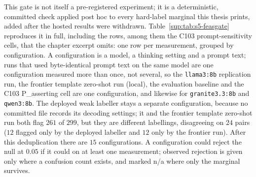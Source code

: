 This gate is not itself a pre-registered experiment; it is a deterministic,
committed check applied post hoc to every hard-label marginal this thesis
prints, added after the hosted results were withdrawn.
Table~\ref{sup:tab:s5-feasgate} reproduces it in full, including the rows,
among them the C103 prompt-sensitivity cells, that the chapter excerpt omits: one row per measurement,
grouped by configuration. A configuration is a model, a thinking setting and a
prompt text; runs that used byte-identical prompt text on the same model are
one configuration measured more than once, not several, so the
\texttt{llama3:8b} replication run, the frontier template zero-shot run (local), the
evaluation baseline and the C103 P\_asserting cell are one configuration, and
likewise for \texttt{granite3.3:8b} and \texttt{qwen3:8b}. The deployed weak
labeller stays a separate configuration, because no committed file records
its decoding settings; it and the frontier template zero-shot run both flag $261$ of
$299$, but they are different labellings, disagreeing on $24$ pairs ($12$
flagged only by the deployed labeller and $12$ only by the frontier run). After this deduplication there are $15$
configurations. A configuration could reject the null at $0.05$ if it could on
at least one measurement; observed rejection is given only where a confusion
count exists, and marked n/a where only the marginal survives.

